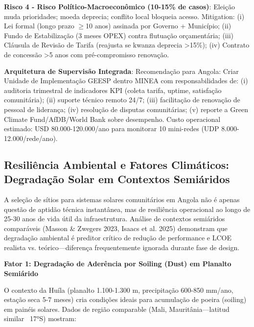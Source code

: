 \documentclass[12pt, a4paper]{article}
\begin{document}
\textbf{Risco 4 - Risco Político-Macroeconômico (10-15\% de casos)}: Eleição muda prioridades; moeda deprecia; conflito local bloqueia acesso. Mitigation: (i) Lei formal (longo prazo $\geq$10 anos) assinada por Governo + Município; (ii) Fundo de Estabilização (3 meses OPEX) contra flutuação orçamentária; (iii) Cláusula de Revisão de Tarifa (reajusta se kwanza deprecia >15\%); (iv) Contrato de concessão >5 anos com pré-compromisso renovação.

\textbf{Arquitetura de Supervisão Integrada}: Recomendação para Angola: Criar Unidade de Implementação GEESP dentro MINEA com responsabilidades de: (i) auditoria trimestral de indicadores KPI (coleta tarifa, uptime, satisfação comunitária); (ii) suporte técnico remoto 24/7; (iii) facilitação de renovação de pessoal de liderança; (iv) resolução de disputas comunitárias; (v) reporte a Green Climate Fund/AfDB/World Bank sobre desempenho. Custo operacional estimado: USD 80.000-120.000/ano para monitorar 10 mini-redes (UDP 8.000-12.000/rede/ano).

\subsection{Resiliência Ambiental e Fatores Climáticos: Degradação Solar em Contextos Semiáridos}

A seleção de sítios para sistemas solares comunitários em Angola não é apenas questão de aptidão técnica instantânea, mas de resiliência operacional ao longo de 25-30 anos de vida útil da infraestrutura. Análise de contextos semiáridos comparáveis (Masson \& Zwegers 2023, Isaacs et al. 2025) demonstram que degradação ambiental é preditor crítico de redução de performance e LCOE realista vs. teórico—diferença frequentemente ignorada durante fase de design.

\textbf{Fator 1: Degradação de Aderência por Soiling (Dust) em Planalto Semiárido}

O contexto da Huíla (planalto 1.100-1.300 m, precipitação 600-850 mm/ano, estação seca 5-7 meses) cria condições ideais para acumulação de poeira (soiling) em painéis solares. Dados de região comparable (Mali, Mauritânia—latitud similar ~17°S) mostram:
\end{document}
